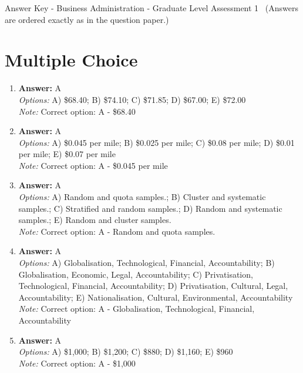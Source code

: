 \documentclass[12pt]{article}
\begin{document}
\begin{center}
Answer Key - Business Administration - Graduate Level Assessment 1 \
\small (Answers are ordered exactly as in the question paper.)
\end{center}

\section*{Multiple Choice}
\begin{enumerate}[label=\arabic*.]
\item \textbf{Answer:} A
\\ \textit{Options:} A) \$68.40; B) \$74.10; C) \$71.85; D) \$67.00; E) \$72.00
\\ \textit{Note:} Correct option: A - \$68.40
\item \textbf{Answer:} A
\\ \textit{Options:} A) \$0.045 per mile; B) \$0.025 per mile; C) \$0.08 per mile; D) \$0.01 per mile; E) \$0.07 per mile
\\ \textit{Note:} Correct option: A - \$0.045 per mile
\item \textbf{Answer:} A
\\ \textit{Options:} A) Random and quota samples.; B) Cluster and systematic samples.; C) Stratified and random samples.; D) Random and systematic samples.; E) Random and cluster samples.
\\ \textit{Note:} Correct option: A - Random and quota samples.
\item \textbf{Answer:} A
\\ \textit{Options:} A) Globalisation, Technological, Financial, Accountability; B) Globalisation, Economic, Legal, Accountability; C) Privatisation, Technological, Financial, Accountability; D) Privatisation, Cultural, Legal, Accountability; E) Nationalisation, Cultural, Environmental, Accountability
\\ \textit{Note:} Correct option: A - Globalisation, Technological, Financial, Accountability
\item \textbf{Answer:} A
\\ \textit{Options:} A) \$1,000; B) \$1,200; C) \$880; D) \$1,160; E) \$960
\\ \textit{Note:} Correct option: A - \$1,000
\end{enumerate}
\end{document}
